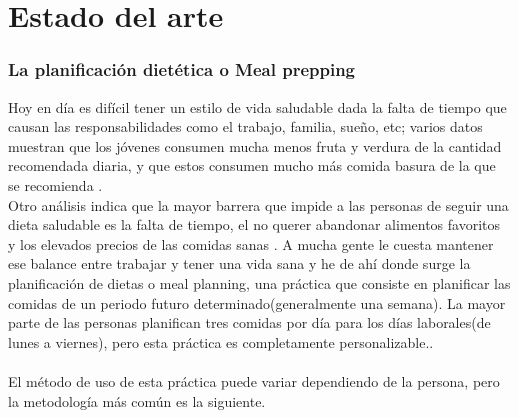 \documentclass[12pt,a4paper]{report} %
\begin{document}
	
	\section*{Estado del arte}
	
	
	\subsubsection*{La planificación dietética o Meal prepping}
	
	Hoy en día es difícil tener un estilo de vida saludable dada la falta de tiempo que causan las responsabilidades como el trabajo, familia, sueño, etc; varios datos muestran que los jóvenes consumen mucha menos fruta y verdura de la cantidad recomendada diaria, y que estos consumen mucho más comida basura de la que se recomienda \cite{NLMDifficultyEatingHealthy}.
	\\
	Otro análisis indica que la mayor barrera que impide a las personas de seguir una dieta saludable es la falta de tiempo, el no querer abandonar alimentos favoritos y los elevados precios de las comidas sanas \cite{NLMDifficultyEatingHealthy}. A mucha gente le cuesta mantener ese balance entre trabajar y tener una vida sana y he de ahí donde surge la planificación de dietas o meal planning, una práctica que consiste en planificar las comidas de un periodo futuro determinado(generalmente una semana). La mayor parte de las personas planifican tres comidas por día para los días laborales(de lunes a viernes), pero esta práctica es completamente personalizable.\cite{HowToMealPrep}.
	\\
	\\
	
	El método de uso de esta práctica puede variar dependiendo de la persona, pero la metodología más común es la siguiente.
	
\end{document}
